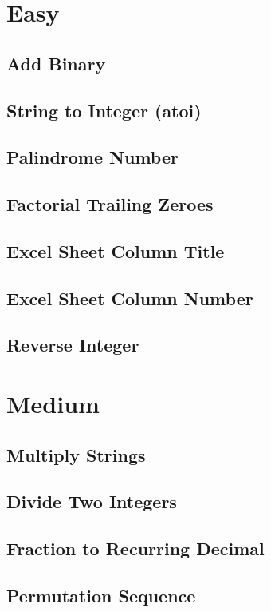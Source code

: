 \documentclass[12pt]{book}
\begin{document}
\section{Easy}
\label{sec-21-1}
\subsection{Add Binary}
\label{sec-21-1-1}
\subsection{String to Integer (atoi)}
\label{sec-21-1-2}
\subsection{Palindrome Number}
\label{sec-21-1-3}
\subsection{Factorial Trailing Zeroes}
\label{sec-21-1-4}
\subsection{Excel Sheet Column Title}
\label{sec-21-1-5}
\subsection{Excel Sheet Column Number}
\label{sec-21-1-6}
\subsection{Reverse Integer}
\label{sec-21-1-7}
\section{Medium}
\label{sec-21-2}
\subsection{Multiply Strings}
\label{sec-21-2-1}
\subsection{Divide Two Integers}
\label{sec-21-2-2}
\subsection{Fraction to Recurring Decimal}
\label{sec-21-2-3}
\subsection{Permutation Sequence}
\label{sec-21-2-4}
\end{document}
